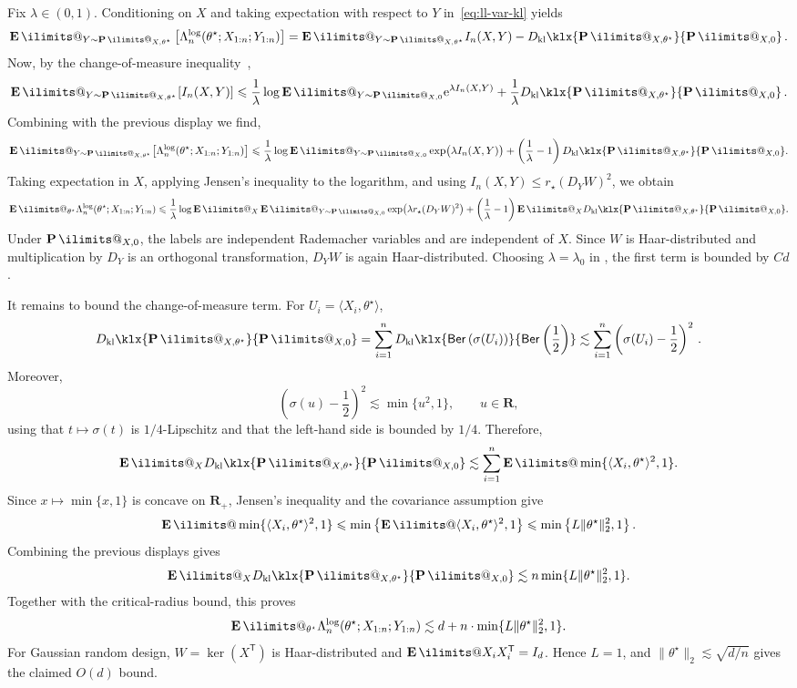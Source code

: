 \documentclass[11pt, letterpaper, hidelinks]{article}
\makeatletter
\renewcommand{\proofname}{\textit{\textbf{Proof}}}
\renewenvironment{proof}[1][\proofname]{\par\pushQED{\qed}\normalfont \topsep6\p@\@plus6\p@\relax\trivlist\item[\hskip\labelsep#1\@addpunct{}]\ignorespaces}{\popQED\endtrivlist\@endpefalse}
\newcommand{\R}{\mathbf R}
\newcommand{\e}{\mathrm{e}}
\newcommand{\1}{\mathbf 1}
\renewcommand{\le}{\leqslant}
\renewcommand{\leq}{\leqslant}
\newcommand{\T}{\mathsf{T}}
\newcommand{\kl}{D_{\rm kl}\klx}
\newcommand{\E}{\operatorname*{\mathbf{E}}\ilimits@}
\renewcommand{\P}{\operatorname*{\mathbf{P}}\ilimits@}
\theoremstyle{plain}
\theoremstyle{definition}
\newcommand{\thetastar}{\theta^\star}
\newcommand{\Ber}[1]{\mathsf{Ber}\left(#1\right)}
\makeatother
\begin{document}
\begin{proof}
Fix $\lambda\in(0,1)$. Conditioning on $X$ and taking expectation with respect to $Y$ in~\eqref{eq:ll-var-kl} yields
\begin{equation}
\E_{Y\sim\P_{X,\thetastar}}\left[\Lambda_n^{\log}(\thetastar;X_{1:n};Y_{1:n})\right]
	= \E_{Y\sim\P_{X,\thetastar}} I_n(X,Y) - \kl{\P_{X,\thetastar}}{\P_{X,0}} \, .
\end{equation}
Now, by the change-of-measure inequality~\cite[Corollary~4.14]{boucheron2013concentration},
\[
\E_{Y\sim\P_{X,\thetastar}}[I_n(X,Y)]
	\leq \frac 1 \lambda \log\E_{Y\sim\P_{X,0}}\e^{\lambda I_n(X,Y)}
		+ \frac1\lambda\kl{\P_{X,\thetastar}}{\P_{X,0}} \, .
\]
Combining with the previous display we find,
\[
\E_{Y\sim\P_{X,\thetastar}}\!
\left[
\Lambda_n^{\log}(\thetastar;X_{1:n};Y_{1:n})
\right]
\leq
\frac1\lambda
\log
\E_{Y\sim\P_{X,0}} 
\exp\bigl(\lambda I_n(X,Y)\bigr)
+
\left(\frac1\lambda-1\right)
\kl{\P_{X,\thetastar}}{\P_{X,0}}.
\]
Taking expectation in $X$, applying Jensen's inequality to the logarithm, and
using $I_n(X,Y)\le r_\star(D_YW)^2$, we obtain
\[
\E_{\thetastar} \Lambda_n^{\operatorname{log}}(\thetastar;X_{1:n};Y_{1:n})
	\leq \frac1\lambda \log \E_X\E_{Y\sim\P_{X,0}} \exp\bigl(\lambda r_\star(D_YW)^2\bigr)
		+ \left(\frac1\lambda-1\right) \E_X \kl{\P_{X,\thetastar}}{\P_{X,0}}.
\]
Under $\P_{X,0}$, the labels are independent Rademacher variables and are
independent of $X$. Since $W$ is Haar-distributed and multiplication by
$D_Y$ is an orthogonal transformation, $D_YW$ is again Haar-distributed.
Choosing $\lambda=\lambda_0$ in
, the first term is bounded by $Cd$.

It remains to bound the change-of-measure term. For $U_i = \langle X_i, \thetastar \rangle$,
\[
\kl{\P_{X,\thetastar}}{\P_{X,0}}
	= \sum_{i=1}^n \kl{\Ber{\sigma(U_i)}}{\Ber{\frac12}}
	\lesssim \sum_{i=1}^n \left(\sigma(U_i)-\frac12\right)^2 \, .
\]
Moreover,
\[
\left(\sigma(u)-\frac12\right)^2 \lesssim \min\{u^2,1\}, \qquad u\in\R,
\]
using that $t\mapsto\sigma(t)$ is $1/4$-Lipschitz and that the left-hand
side is bounded by $1/4$. Therefore,
\[
\E_X \kl{\P_{X,\thetastar}}{\P_{X,0}}
\lesssim
\sum_{i=1}^n
\E\min\{\langle X_i,\thetastar\rangle^2,1\}.
\]
Since $x\mapsto \min\{x,1\}$ is concave on $\R_+$, Jensen's inequality and
the covariance assumption give
\[
\E\min\{\langle X_i,\thetastar\rangle^2,1\}
\leq
\min\left\{
\E\langle X_i,\thetastar\rangle^2,1
\right\}
\leq
\min\left\{
L\|\thetastar\|_2^2,1
\right\}.
\]
Combining the previous displays gives
\[
\E_X\kl{\P_{X,\thetastar}}{\P_{X,0}}
\lesssim
n\min\{L\|\thetastar\|_2^2,1\}.
\]
Together with the critical-radius bound, this proves
\[
\E_{\thetastar}
\Lambda_n^{\operatorname{log}}(\thetastar;X_{1:n};Y_{1:n})
\lesssim
d+n \cdot \min\{L\|\thetastar\|_2^2,1\}.
\]
For Gaussian random design, $W=\ker(X^\T)$ is Haar-distributed and
$\E X_iX_i^\T=I_d$. Hence $L=1$, and
$\|\thetastar\|_2\lesssim \sqrt{d/n}$ gives the claimed $O(d)$ bound.
\end{proof}
\end{document}
